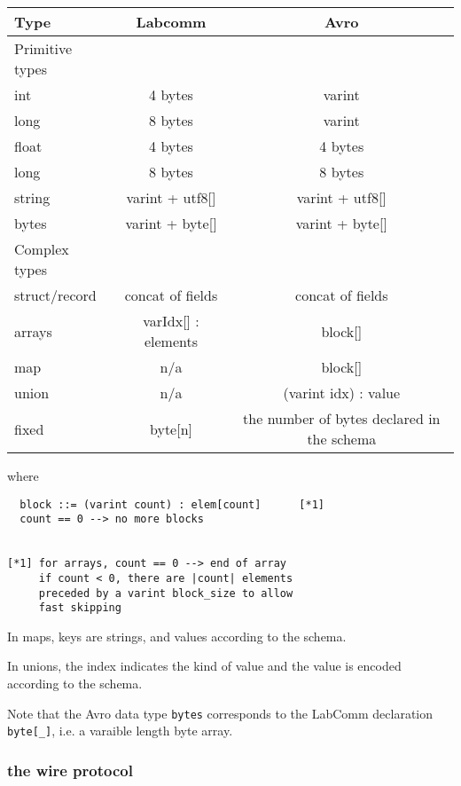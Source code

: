 \documentclass[a4paper]{article}
\begin{document}
\begin{tabular}{|l|c|c|}
\hline
  Type &            Labcomm  &               Avro \\
  \hline Primitive types \\ \hline

int    &         4 bytes     &           varint  \\
long   &         8 bytes     &           varint  \\
float  &         4 bytes     &           4 bytes \\
long   &         8 bytes     &           8 bytes \\
string &         varint + utf8[]   &     varint + utf8[] \\ 
bytes  &         varint + byte[]   &     varint + byte[]\\

  \hline Complex types  \\ \hline

struct/record &  concat of fields     &  concat of fields \\ 
arrays        &  varIdx[] : elements  &  block[]          \\
map           &    n/a                &  block[]          \\
union         &   n/a                 & (varint idx) : value \\
fixed         &   byte[n]             &  the number of bytes declared in
the schema\\
\hline
\end{tabular}

  where 

\begin{verbatim}  
  block ::= (varint count) : elem[count]      [*1]
  count == 0 --> no more blocks


[*1] for arrays, count == 0 --> end of array
     if count < 0, there are |count| elements
     preceded by a varint block_size to allow
     fast skipping
\end{verbatim}  

In maps, keys are strings, and values  according to the schema.

In unions, the index indicates the kind of value and the
value is encoded according to the schema.

Note that the Avro data type \verb+bytes+ corresponds to the
LabComm declaration \verb+byte[_]+, i.e. a varaible length byte array.

\subsubsection*{the wire protocol}
\end{document}
